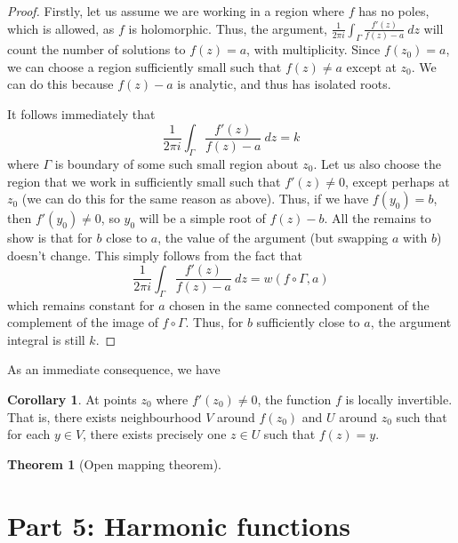 \documentclass[aps,pra,showpacs,notitlepage,onecolumn,superscriptaddress,nofootinbib]{revtex4-1}
\theoremstyle{definition}
\newtheorem{theorem}{Theorem}[section]
\newtheorem{corollary}{Corollary}[theorem]
\begin{document}
\begin{proof}
  Firstly, let us assume we are working in a region where $f$ has no poles, which is allowed, as $f$ is holomorphic. Thus, the argument, $\frac{1}{2\pi i} \int_{\Gamma} \frac{f'(z)}{f(z) - a} \ dz$
  will count the number of solutions to $f(z) = a$, with multiplicity. Since $f(z_0) = a$, we can choose a region sufficiently small such that $f(z) \neq a$ except at $z_0$. We can do this because
  $f(z) - a$ is analytic, and thus has isolated roots.

  It follows immediately that
  \begin{equation}
    \frac{1}{2\pi i} \int_{\Gamma} \frac{f'(z)}{f(z) - a} \ dz = k
  \end{equation}
  where $\Gamma$ is boundary of some such small region about $z_0$. Let us also choose the region that we work in sufficiently small such that $f'(z) \neq 0$, except perhaps at $z_0$ (we can do this for the same reason
  as above). Thus, if we have $f(y_0) = b$, then $f'(y_0) \neq 0$, so $y_0$ will be a simple root of $f(z) - b$. All the remains to show is that for $b$ close to $a$, the value of the argument (but swapping $a$ with $b$)
  doesn't change. This simply follows from the fact that
  \begin{equation}
    \frac{1}{2\pi i} \int_{\Gamma} \frac{f'(z)}{f(z) - a} \ dz = w(f \circ \Gamma, a)
  \end{equation}
  which remains constant for $a$ chosen in the same connected component of the complement of the image of $f \circ \Gamma$. Thus, for $b$ sufficiently close to $a$, the argument integral is still $k$.
\end{proof}

\noindent As an immediate consequence, we have

\begin{corollary}
  At points $z_0$ where $f'(z_0) \neq 0$, the function $f$ is locally invertible. That is, there exists neighbourhood $V$ around $f(z_0)$ and $U$ around $z_0$ such that for each $y \in V$, there exists precisely
  one $z \in U$ such that $f(z) = y$.
  \end{corollary}

\begin{theorem}[Open mapping theorem]
  \end{theorem}

\section{Part 5: Harmonic functions}
\end{document}
